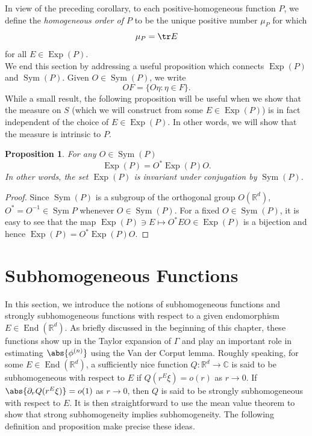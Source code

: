 \documentclass[11pt, letter]{book}
\newtheorem{proposition}[theorem]{Proposition}
\newcommand\End{\operatorname{End}} %
\newcommand\Sym{\operatorname{Sym}}
\newcommand\Exp{\operatorname{Exp}}
\newcommand{\p}{\partial}
\begin{document}
\noindent In view of the preceding corollary, to each positive-homogeneous function $P$, we define the \textit{homogeneous order of $P$} to be the unique positive number $\mu_P$ for which
\begin{equation*}
\mu_P=\tr E
\end{equation*}
for all $E\in\Exp(P)$. \\



\noindent We end this section by addressing a useful proposition which connects $\Exp(P)$ and $\Sym(P)$. Given $O\in\Sym(P)$, we write
\begin{equation*}
    OF=\{O\eta:\eta\in F\}.
\end{equation*}
While a small result, the following proposition will be useful when we show that the measure on $S$ (which we will construct from some $E\in \Exp(P)$) is in fact independent of the choice of $E\in \Exp(P)$. In other words, we will show that the measure is intrinsic to $P$. 

\begin{framed}
\begin{proposition}\label{prop:ExpP}
For any  $O \in \Sym{(P)} $
\begin{equation*}
    \Exp(P) = O^* \Exp(P) O.
\end{equation*}
In other words, the set $\Exp(P)$ is invariant under conjugation by $\Sym(P)$.
\end{proposition}
\end{framed}

\begin{proof}
Since $\Sym(P)$ is a subgroup of the orthogonal group $O(\mathbb{R}^d)$, $O^* = O^{-1} \in \Sym{P}$ whenever $O\in\Sym(P)$. For a fixed $O\in\Sym(P)$, it is easy to see that the map $\Exp(P)\ni E\mapsto  O^* E O\in\Exp(P)$ is a bijection and hence $\Exp(P)=O^* \Exp(P) O$. 
\end{proof}







\section{Subhomogeneous Functions}
In this section, we introduce the notions of subhomogeneous functions and strongly subhomogeneous functions with respect to a given endomorphism $E\in\End(\mathbb{R}^d)$. As briefly discussed in the beginning of this chapter, these functions show up in the Taylor expansion of $\Gamma$ and play an important role in estimating $\abs{\phi^{(n)}}$ using the Van der Corput lemma. Roughly speaking, for some $E\in \End{(\mathbb{R}^d)}$, a sufficiently nice function $Q: \mathbb{R}^d \to \mathbb{C}$ is said to be subhomogeneous with respect to $E$ if $Q(r^E \xi) = o(r)$ as $r\to 0$. If $\abs{\p_r Q(r^E \xi)} = o(1)$ as $r\to 0$, then $Q$ is said to be strongly subhomogeneous with respect to $E$. It is then straightforward to use the mean value theorem to show that strong subhomogeneity implies subhomogeneity. The following definition and proposition make precise these ideas. 
\end{document}
